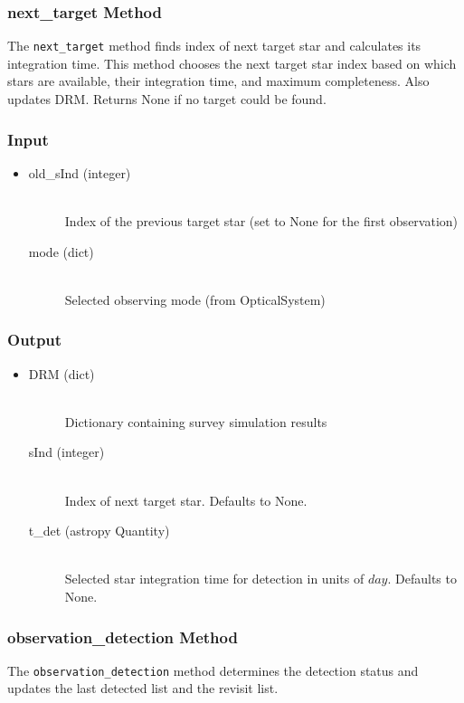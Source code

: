 \documentclass[cleanfoot]{asme2ej}
\begin{document}
\subsubsection{next\_target Method} \label{sec:nexttargettask}
The \verb+next_target+ method finds index of next target star and calculates its integration time. This method chooses the next target star index based on which stars are available, their integration time, and maximum completeness. Also updates DRM. Returns None if no target could be found.

\subsubsection*{Input}
\begin{itemize}
\item 
\begin{description}
    \item[old\_sInd (integer)] \hfill \\ Index of the previous target star (set to None for the first observation)
    \item[mode (dict)] \hfill \\ Selected observing mode (from OpticalSystem)
\end{description}
\end{itemize}

\subsubsection*{Output}
\begin{itemize}
\item 
\begin{description}
    \item[DRM (dict)] \hfill \\ Dictionary containing survey simulation results
    \item[sInd (integer)] \hfill \\ Index of next target star. Defaults to None.
    \item[t\_det (astropy Quantity)] \hfill \\ Selected star integration time for detection in units of $day$. Defaults to None.
\end{description}
\end{itemize}

\subsubsection{observation\_detection Method} \label{sec:observationdetectiontask}
The \verb+observation_detection+ method determines the detection status and updates the last detected list and the revisit list. 
\end{document}
